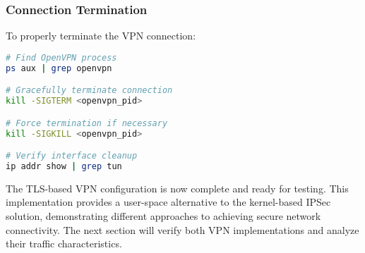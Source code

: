 \subsubsection{Connection Termination}

To properly terminate the VPN connection:

\begin{lstlisting}[language=bash]
# Find OpenVPN process
ps aux | grep openvpn

# Gracefully terminate connection
kill -SIGTERM <openvpn_pid>

# Force termination if necessary
kill -SIGKILL <openvpn_pid>

# Verify interface cleanup
ip addr show | grep tun
\end{lstlisting}

\noindent
The TLS-based VPN configuration is now complete and ready for testing. This implementation provides a user-space alternative to the kernel-based IPSec solution, demonstrating different approaches to achieving secure network connectivity. The next section will verify both VPN implementations and analyze their traffic characteristics.
